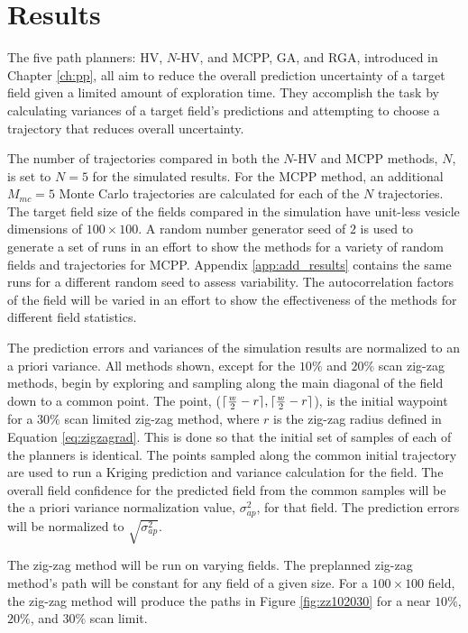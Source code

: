 \chapter{Results} \label{ch:results}
The five path planners: HV, $N$-HV, and MCPP, GA, and RGA, introduced in Chapter \ref{ch:pp}, all aim to reduce the overall prediction uncertainty of a target field given a limited amount of exploration time. They accomplish the task by calculating variances of a target field's predictions and attempting to choose a trajectory that reduces overall uncertainty. 

The number of trajectories compared in both the $N$-HV and MCPP methods, $N$, is set to $N=5$ for the simulated results. For the MCPP method, an additional $M_{mc}=5$ Monte Carlo trajectories are calculated for each of the $N$ trajectories. The target field size of the fields compared in the simulation have unit-less vesicle dimensions of $100\times 100$. A random number generator seed of $2$ is used to generate a set of runs in an effort to show the methods for a variety of random fields and trajectories for MCPP. Appendix \ref{app:add_results} contains the same runs for a different random seed to assess variability. The autocorrelation factors of the field will be varied in an effort to show the effectiveness of the methods for different field statistics.

The prediction errors and variances of the simulation results are normalized to an a priori variance. All methods shown, except for the $10\%$ and $20\%$ scan zig-zag methods, begin by exploring and sampling along the main diagonal of the field down to a common point. The point, ($\Large\lceil\frac{w}{2} - r \Large\rceil, \Large\lceil \frac{w}{2} - r \Large\rceil$), is the initial waypoint for a $30\%$ scan limited zig-zag method, where $r$ is the zig-zag radius defined in Equation \ref{eq:zigzagrad}. This is done so that the initial set of samples of each of the planners is identical. The points sampled along the common initial trajectory are used to run a Kriging prediction and variance calculation for the field. The overall field confidence for the predicted field from the common samples will be the a priori variance normalization value, $\sigma^{2}_{ap}$, for that field. The prediction errors will be normalized to $\sqrt{\sigma^{2}_{ap}}$.

The zig-zag method will be run on varying fields. The preplanned zig-zag method's path will be constant for any field of a given size. For a $100 \times 100$ field, the zig-zag method will produce the paths in Figure \ref{fig:zz102030} for a near $10\%$, $20\%$, and $30\%$ scan limit.


